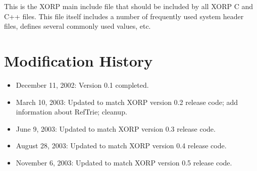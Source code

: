 \documentclass[11pt]{article}
\begin{document}
This is the XORP main include file that should be included by all XORP
C and C++ files. This file itself includes a number of frequently used system
header files, defines several commonly used values, etc.


\appendix
\section{Modification History}

\begin{itemize}

  \item December 11, 2002: Version 0.1 completed.

  \item March 10, 2003: Updated to match XORP version 0.2 release code;
  add information about RefTrie; cleanup.

  \item June 9, 2003: Updated to match XORP version 0.3 release code.

  \item August 28, 2003: Updated to match XORP version 0.4 release
  code.

  \item November 6, 2003: Updated to match XORP version 0.5 release code.

\end{itemize}




\end{document}
